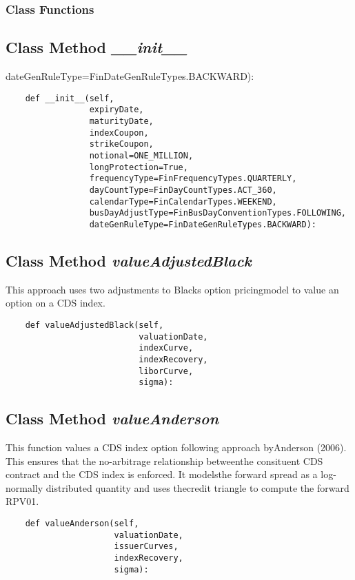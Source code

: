 \documentclass[twoside,11pt]{book}
\begin{document}
\subsubsection{Class Functions}

\subsection{Class Method {\it \_\_init\_\_}}
dateGenRuleType=FinDateGenRuleTypes.BACKWARD):

\begin{lstlisting}
    def __init__(self,
                 expiryDate,
                 maturityDate,
                 indexCoupon,
                 strikeCoupon,
                 notional=ONE_MILLION,
                 longProtection=True,
                 frequencyType=FinFrequencyTypes.QUARTERLY,
                 dayCountType=FinDayCountTypes.ACT_360,
                 calendarType=FinCalendarTypes.WEEKEND,
                 busDayAdjustType=FinBusDayConventionTypes.FOLLOWING,
                 dateGenRuleType=FinDateGenRuleTypes.BACKWARD):
\end{lstlisting}

\subsection{Class Method {\it valueAdjustedBlack}}
This approach uses two adjustments to Blacks option pricingmodel to value an option on a CDS index. 

\begin{lstlisting}
    def valueAdjustedBlack(self,
                           valuationDate,
                           indexCurve,
                           indexRecovery,
                           liborCurve,
                           sigma):
\end{lstlisting}

\subsection{Class Method {\it valueAnderson}}
This function values a CDS index option following approach byAnderson (2006). This ensures that the no-arbitrage relationship betweenthe consituent CDS contract and the CDS index is enforced. It modelsthe forward spread as a log-normally distributed quantity and uses thecredit triangle to compute the forward RPV01. 

\begin{lstlisting}
    def valueAnderson(self,
                      valuationDate,
                      issuerCurves,
                      indexRecovery,
                      sigma):
\end{lstlisting}
\end{document}
